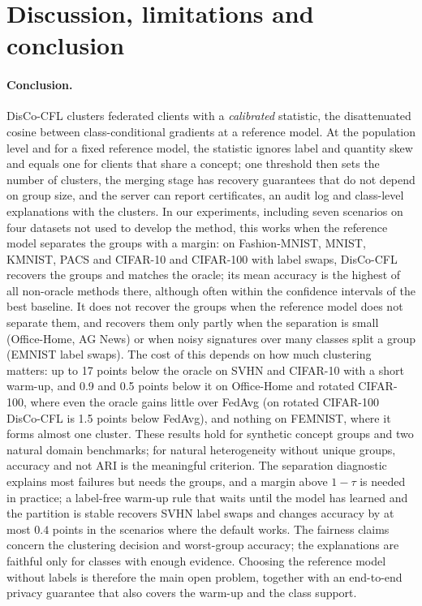 \documentclass[11pt]{article}
\theoremstyle{definition}
\theoremstyle{remark}
\begin{document}
\section{Discussion, limitations and conclusion}\label{sec:discussion}


\paragraph{Conclusion.} DisCo-CFL clusters federated clients with a \emph{calibrated} statistic, the disattenuated cosine between class-conditional gradients at a reference model. At the population level and for a fixed reference model, the statistic ignores label and quantity skew and equals one for clients that share a concept; one threshold then sets the number of clusters, the merging stage has recovery guarantees that do not depend on group size, and the server can report certificates, an audit log and class-level explanations with the clusters. In our experiments, including seven scenarios on four datasets not used to develop the method, this works when the reference model separates the groups with a margin: on Fashion-MNIST, MNIST, KMNIST, PACS and CIFAR-10 and CIFAR-100 with label swaps, DisCo-CFL recovers the groups and matches the oracle; its mean accuracy is the highest of all non-oracle methods there, although often within the confidence intervals of the best baseline. It does not recover the groups when the reference model does not separate them, and recovers them only partly when the separation is small (Office-Home, AG News) or when noisy signatures over many classes split a group (EMNIST label swaps). The cost of this depends on how much clustering matters: up to 17 points below the oracle on SVHN and CIFAR-10 with a short warm-up, and 0.9 and 0.5 points below it on Office-Home and rotated CIFAR-100, where even the oracle gains little over FedAvg (on rotated CIFAR-100 DisCo-CFL is 1.5 points below FedAvg), and nothing on FEMNIST, where it forms almost one cluster. These results hold for synthetic concept groups and two natural domain benchmarks; for natural heterogeneity without unique groups, accuracy and not ARI is the meaningful criterion. The separation diagnostic explains most failures but needs the groups, and a margin above $1-\tau$ is needed in practice; a label-free warm-up rule that waits until the model has learned and the partition is stable recovers SVHN label swaps and changes accuracy by at most $0.4$ points in the scenarios where the default works. The fairness claims concern the clustering decision and worst-group accuracy; the explanations are faithful only for classes with enough evidence. Choosing the reference model without labels is therefore the main open problem, together with an end-to-end privacy guarantee that also covers the warm-up and the class support.
\end{document}
